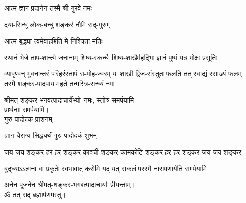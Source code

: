 \begin{center}
{आत्म-ज्ञान-प्रदानेन तस्मै श्री-गुरवे नमः}

{दया-सिन्धुं लोक-बन्धुं शङ्करं नौमि सद्-गुरुम्}

{आत्म-बुद्ध्या त्वमेवाहमिति मे निश्चिता मतिः}

{स्थानं भेजे ताप-शान्त्यै जनानाम्}
{शिष्य-स्कन्धैः शिष्य-शाखैर्महद्भिः}
{ज्ञानं पुष्पं यत्र मोक्षः प्रसूतिः}

{व्यावृण्वन् भुवनान्तरं परिहरंस्तापं स-मोह-ज्वरम्}
{यः शाखी द्विज-संस्तुतः फलति तत् स्वाद्यं रसाख्यं फलम्}
{तस्मै शङ्कर-पादपाय महते तन्मस्त्रि-सन्ध्यं नमः}

श्रीमत्-शङ्कर-भगवत्पादाचार्येभ्यो~नमः, स्तोत्रं समर्पयामि।\\

प्रार्थनाः समर्पयामि।\\

{गुरु-पादोदक-प्राशनम्\textsf{---}\hfill}

{ज्ञान-वैराग्य-सिद्ध्यर्थं गुरु-पादोदकं शुभम्}

\closesection







{जय जय शङ्कर हर हर शङ्कर}
{काञ्ची-शङ्कर कामकोटि-शङ्कर}
{हर हर शङ्कर जय जय शङ्कर}

{बुद्‌ध्याऽऽत्मना वा प्रकृतेः स्वभावात्}
{करोमि यद् यत् सकलं परस्मै}
{नारायणायेति समर्पयामि}

अनेन पूजनेन श्रीमत्-शङ्कर-भगवत्पादाचार्याः प्रीयन्ताम्। \\

ॐ तत् सद् ब्रह्मार्पणमस्तु।

\closesection





\end{center}
\closesection


